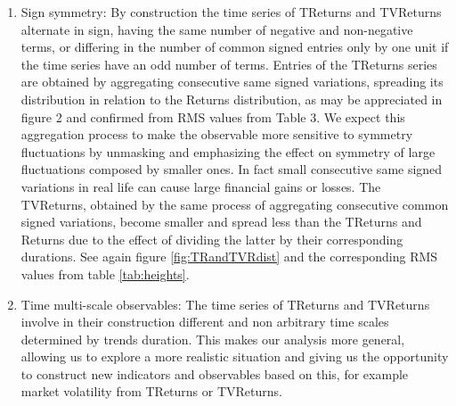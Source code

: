 \documentclass{elsarticle}
\begin{document}
\begin{enumerate}

\item Sign symmetry: By construction the time series of TReturns and TVReturns
alternate in sign, having the same number of negative and non-negative
terms, or differing in the number of common signed entries only by one unit
if the time series have an odd number of terms. Entries of the TReturns series are
obtained by aggregating consecutive same signed variations, spreading its
distribution in relation to the Returns distribution, as may be appreciated in
figure 2 and confirmed from RMS values from Table 3. We expect this
aggregation process to make the observable more sensitive to symmetry
fluctuations by unmasking and emphasizing the effect on symmetry
of large fluctuations composed by smaller ones. In fact small consecutive
same signed variations in real life can cause large financial gains or
losses.
The TVReturns, obtained by the same process of aggregating consecutive common signed
variations, become smaller and spread less than the TReturns and Returns  due to the effect of dividing
the latter by their corresponding durations. See again figure \ref{fig:TRandTVRdist} and the corresponding RMS  values from table \ref{tab:heights}.

\item Time multi-scale observables: The time series of TReturns and TVReturns
involve in their construction different and non arbitrary time scales determined by trends duration. This makes our analysis more general, allowing us to explore a more realistic situation and giving us the opportunity to construct new indicators and observables based on this, for example market volatility from TReturns or TVReturns.
\end{enumerate}
\end{document}
